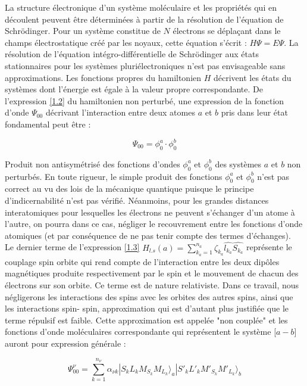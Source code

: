 La structure électronique d'un système moléculaire et les propriétés qui en découlent peuvent être déterminées à partir de la résolution de l'équation de Schr\"{o}dinger. Pour un système constitue de $N$ électrons se déplaçant dans le champs électrostatique créé par les noyaux, cette équation s'écrit : $H\Psi = E\Psi$. La résolution de l'équation intégro-différentielle de Schr\"{o}dinger aux états stationnaires pour les systèmes pluriélectroniques n'est pas envisageable sans approximations. Les fonctions propres du hamiltonien $H$ décrivent les états du systèmes dont l'énergie est égale à la valeur propre correspondante. De l'expression \ref{1.2} du hamiltonien non perturbé, une expression de la fonction d'onde $\Psi_{00}$ décrivant l'interaction entre deux atomes $a$ et $b$ pris dans leur état fondamental peut être : 

\begin{equation}
\Psi_{00} = \phi_{0}^{a} \cdot \phi_{0}^{b}
\end{equation}

Produit non antisymétrisé des fonctions d'ondes $\phi_{0}^{a}$ et $\phi_{0}^{b}$ des systèmes $a$ et $b$ non perturbés. En toute rigueur, le simple produit des fonctions $\phi_{0}^{a}$ et $\phi_{0}^{b}$ n'est pas correct au vu des lois de la mécanique quantique puisque le principe d'indicernabilité n'est pas vérifié. Néanmoins, pour les grandes distances interatomiques pour lesquelles les électrons ne peuvent s'échanger d'un atome à l'autre, on pourra dans ce cas, négliger le recouvrement entre les fonctions d'onde atomiques (et par conséquence de ne pas tenir compte des termes d'échanges).\\

Le dernier terme de l'expression \ref{1.3} $H_{l.s}(a) = \sum_{k_{a}=1}^{n_{a}} \zeta_{k_{a}} \widehat{l_{k_{a}}} \widehat{S_{k_{a}}}$ représente le couplage spin orbite qui rend compte de l'interaction entre les deux dipôles magnétiques produite respectivement par le spin et le mouvement de chacun des électrons sur son orbite. Ce terme est de nature relativiste. Dans ce travail, nous négligerons les interactions des spins avec les orbites des autres spins, ainsi que les interactions spin- spin, approximation qui est d'autant plus justifiée que le terme répulsif est faible. Cette approximation est appelée "non couplée" \cite{fontana1961theory,fontana1962theory} et les fonctions d'onde moléculaires correspondante qui représentent le système [$a-b$] auront pour expression générale : 

\begin{equation}
\Psi_{00}^{\nu} = \sum_{k=1}^{n_{\nu}} \alpha_{\nu k}| S_{k} L_{k} M_{S_{k}} M_{L_{k}} \rangle _{a} | S'_{k} L'_{k} M'_{S_{k}} M'_{L_{k}} \rangle _{b}
\end{equation}

